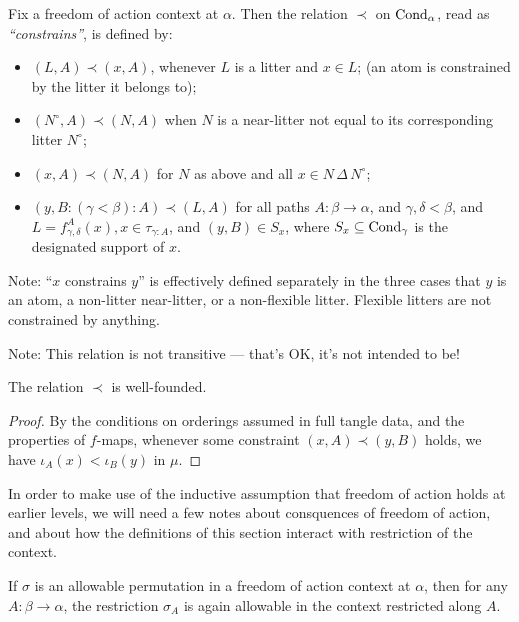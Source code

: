 \begin{definition}
  \label{def:constrains}
  Fix a freedom of action context at $\alpha$. Then the relation \( \prec \)  on $\mathrm{Cond}_\alpha$, read as \emph{“constrains”}, is defined by:
  \begin{itemize}
    \item \( (L, A) \prec (x, A) \), whenever \( L \) is a litter and \( x \in L \); (an atom is constrained by the litter it belongs to);
    \item \( (N^\circ, A) \prec (N, A) \) when \( N \) is a near-litter not equal to its corresponding litter \( N^\circ \);
    \item \( (x, A) \prec (N, A) \) for $N$ as above and all \( x \in N\,\Delta\, N^\circ \);
    \item \( (y, B:(\gamma<\beta):A) \prec (L, A) \) for all paths \( A \colon \beta \to \alpha \), and \( \gamma,\delta < \beta \), and \( L = f^A_{\gamma,\delta}(x), x \in \tau_{\gamma:A} \), and \( (y,B) \in S_x \), where \( S_x \subseteq \mathrm{Cond}_\gamma \) is the designated support of \( x \).
  \end{itemize}

  Note: “$x$ constrains $y$” is effectively defined separately in the three cases that $y$ is an atom, a non-litter near-litter, or a non-flexible litter. Flexible litters are not constrained by anything.

  Note: This relation is not transitive — that’s OK, it’s not intended to be!
\end{definition}

\begin{proposition}
  \label{prop:constrains-well-founded}
  The relation \( \prec \) is well-founded.
\end{proposition}
\begin{proof}
  By the conditions on orderings assumed in full tangle data, and the properties of $f$-maps, whenever some constraint \( (x, A) \prec (y,B) \) holds, we have \( \iota_A(x) < \iota_B(y) \) in \( \mu \).
\end{proof}

In order to make use of the inductive assumption that freedom of action holds at earlier levels, we will need a few notes about consquences of freedom of action, and about how the definitions of this section interact with restriction of the context.

\begin{proposition}
  \label{prop:restrict-allowable-partial-perm}
  If $\sigma$ is an allowable permutation in a freedom of action context at $\alpha$, then for any $A : \beta \to \alpha$, the restriction $\sigma_A$ is again allowable in the context restricted along $A$.
\end{proposition}

